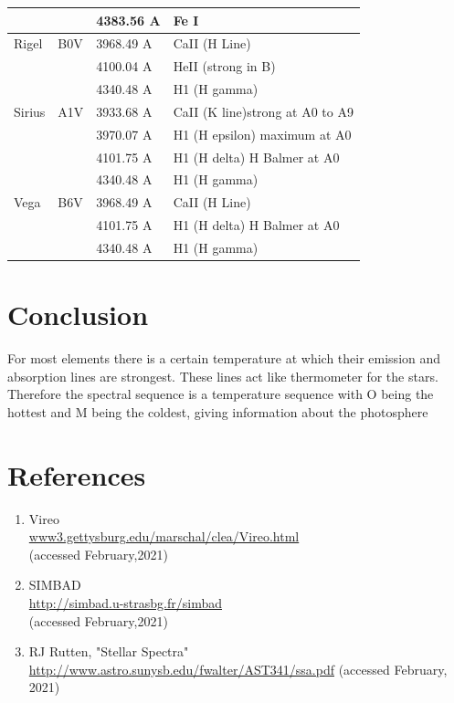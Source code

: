 \documentclass[letterpaper,11pt]{report}
\begin{document}
\begin{center}
\begin{tabular}{|m{5em}|m{5em}|m{5em}|m{10em}|}
             &&4383.56 A& Fe I \\
             \hline
             Rigel &B0V&3968.49 A&CaII (H Line)\\ 
             &&4100.04 A&HeII (strong in B) \\
             &&4340.48 A&H1 (H gamma) \\
             \hline
             Sirius &A1V&3933.68 A&CaII (K line)strong at A0 to A9\\ 
             && 3970.07 A&H1 (H epsilon) maximum at A0\\ 
             &&4101.75 A&H1 (H delta) H Balmer at A0\\
             && 4340.48 A&H1 (H gamma) \\
             \hline
             Vega &B6V&3968.49 A&CaII (H Line)\\ 
             && 4101.75 A&H1 (H delta) H Balmer at A0 \\ && 4340.48 A& H1 (H gamma)\\
             \hline
        \end{tabular}
    \end{center}
\section{Conclusion}
For most elements there is a certain temperature at which their emission and absorption lines are strongest. These lines act like thermometer for the stars. Therefore the spectral sequence is a temperature sequence with O being the hottest and M being the coldest, giving information about the photosphere

\section{References}
\begin{enumerate}
    \item Vireo\\ \href{www3.gettysburg.edu/marschal/clea/Vireo.html}{www3.gettysburg.edu/marschal/clea/Vireo.html}\\(accessed February,2021)
    \item SIMBAD \\ \href{http://simbad.u-strasbg.fr/simbad}{http://simbad.u-strasbg.fr/simbad}\\(accessed February,2021)
    \item RJ Rutten, "Stellar Spectra" \\ 
    \href{http://www.astro.sunysb.edu/fwalter/AST341/ssa.pdf}{http://www.astro.sunysb.edu/fwalter/AST341/ssa.pdf} (accessed February, 2021)
\end{enumerate}
\end{document}
